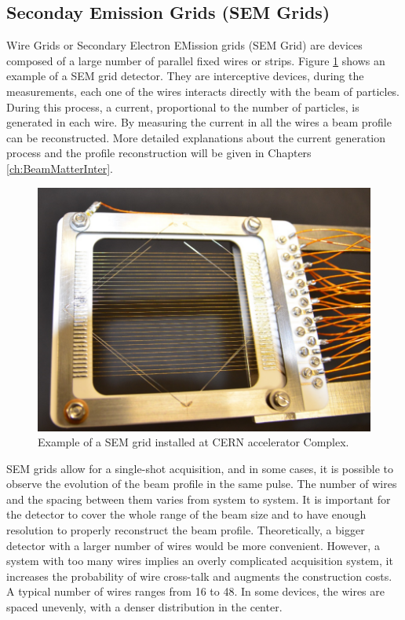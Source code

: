 \subsection{Seconday Emission Grids (SEM Grids)}
\label{sec:SEMgrids}

Wire Grids or Secondary Electron EMission grids (SEM Grid) are devices composed of a large number of parallel fixed wires or strips. Figure \ref{fig:SEMgrid} shows an example of a SEM grid detector. They are interceptive devices, during the measurements, each one of the wires interacts directly with the beam of particles. During this process, a current, proportional to the number of particles, is generated in each wire.  By measuring the current in all the wires a beam profile can be reconstructed. More detailed explanations about the current generation process and the profile reconstruction will be given in Chapters \ref{ch:BeamMatterInter}.

\begin{figure}[h]
    \centering
    \includegraphics[width=0.6\columnwidth]{SEMGrid/semgrid.png}
    \caption{Example of a SEM grid installed at CERN accelerator Complex. }
    \label{fig:SEMgrid}
\end{figure}

SEM grids allow for a single-shot acquisition, and in some cases, it is possible to observe the evolution of the beam profile in the same pulse. The number of wires and the spacing between them varies from system to system. It is important for the detector to cover the whole range of the beam size and to have enough resolution to properly reconstruct the beam profile. Theoretically, a bigger detector with a larger number of wires would be more convenient. However, a system with too many wires implies an overly complicated acquisition system, it increases the probability of wire cross-talk and augments the construction costs. A typical number of wires ranges from 16 to 48. In some devices, the wires are spaced unevenly, with a denser distribution in the center. 

